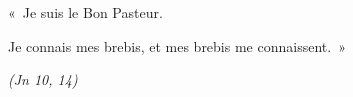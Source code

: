 «~Je suis le Bon Pasteur.\par
Je connais mes brebis, et mes brebis me connaissent.~»\par
\hspace{4cm}\textit{(Jn 10, 14)}